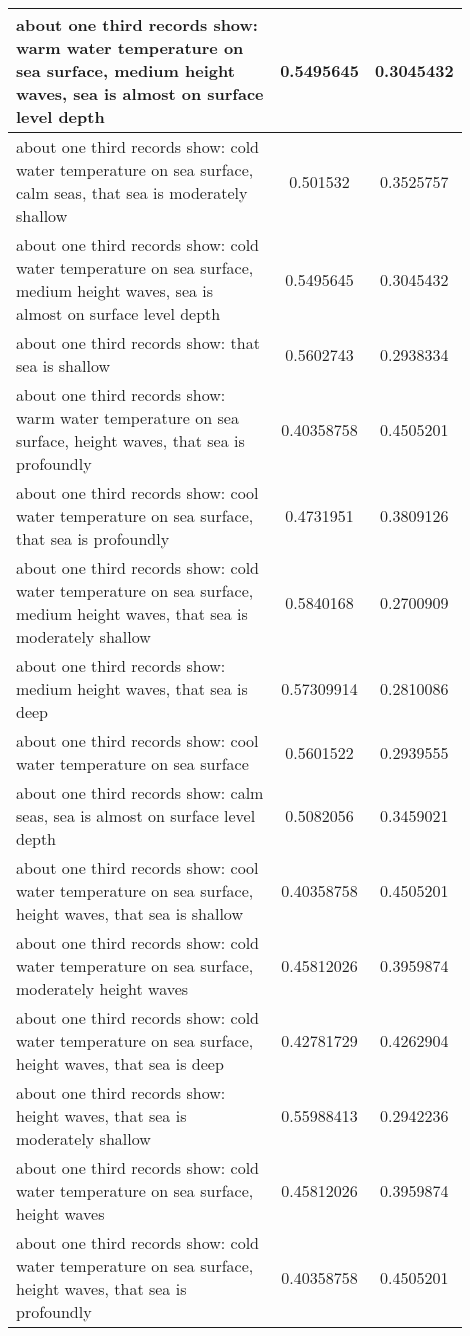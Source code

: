 \documentclass{article}
\begin{document}
\begin{longtable}{|p{0.9\linewidth}|c|c|}
about one third records show: warm water temperature on sea surface, medium height waves, sea is almost on surface level depth & 0.5495645 & 0.3045432 \\ \hline
about one third records show: cold water temperature on sea surface, calm seas, that sea is moderately shallow & 0.501532 & 0.3525757 \\ \hline
about one third records show: cold water temperature on sea surface, medium height waves, sea is almost on surface level depth & 0.5495645 & 0.3045432 \\ \hline
about one third records show: that sea is shallow & 0.5602743 & 0.2938334 \\ \hline
about one third records show: warm water temperature on sea surface, height waves, that sea is profoundly & 0.40358758 & 0.4505201 \\ \hline
about one third records show: cool water temperature on sea surface, that sea is profoundly & 0.4731951 & 0.3809126 \\ \hline
about one third records show: cold water temperature on sea surface, medium height waves, that sea is moderately shallow & 0.5840168 & 0.2700909 \\ \hline
about one third records show: medium height waves, that sea is deep & 0.57309914 & 0.2810086 \\ \hline
about one third records show: cool water temperature on sea surface & 0.5601522 & 0.2939555 \\ \hline
about one third records show: calm seas, sea is almost on surface level depth & 0.5082056 & 0.3459021 \\ \hline
about one third records show: cool water temperature on sea surface, height waves, that sea is shallow & 0.40358758 & 0.4505201 \\ \hline
about one third records show: cold water temperature on sea surface, moderately height waves & 0.45812026 & 0.3959874 \\ \hline
about one third records show: cold water temperature on sea surface, height waves, that sea is deep & 0.42781729 & 0.4262904 \\ \hline
about one third records show: height waves, that sea is moderately shallow & 0.55988413 & 0.2942236 \\ \hline
about one third records show: cold water temperature on sea surface, height waves & 0.45812026 & 0.3959874 \\ \hline
about one third records show: cold water temperature on sea surface, height waves, that sea is profoundly & 0.40358758 & 0.4505201 \\ \hline

\end{longtable}
\end{document}
